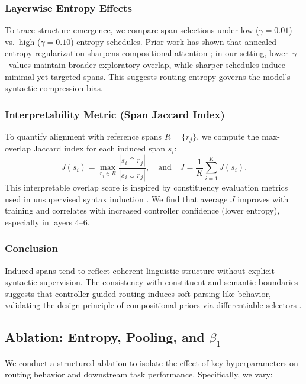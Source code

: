 \subsubsection*{Layerwise Entropy Effects}

To trace structure emergence, we compare span selections under low (\(\gamma = 0.01\)) vs.\ high (\(\gamma = 0.10\)) entropy schedules. Prior work has shown that annealed entropy regularization sharpens compositional attention \cite{pereyra2017regularizing, gupta2022molt}; in our setting, lower~\(\gamma\)~values maintain broader exploratory overlap, while sharper schedules induce minimal yet targeted spans. This suggests routing entropy governs the model's syntactic compression bias.

\subsubsection*{Interpretability Metric (Span Jaccard Index)}

To quantify alignment with reference spans \(R = \{r_j\}\), we compute the max-overlap Jaccard index for each induced span \(s_i\):
\[
J(s_i) = \max_{r_j \in R} \frac{|s_i \cap r_j|}{|s_i \cup r_j|}, \quad \text{and} \quad \bar{J} = \frac{1}{K} \sum_{i=1}^K J(s_i).
\]
This interpretable overlap score is inspired by constituency evaluation metrics used in unsupervised syntax induction \cite{kim2019unsupervised, naradowsky2021structured}. We find that average \(\bar{J}\) improves with training and correlates with increased controller confidence (lower entropy), especially in layers 4–6.

\subsubsection*{Conclusion}

Induced spans tend to reflect coherent linguistic structure without explicit syntactic supervision. The consistency with constituent and semantic boundaries suggests that controller-guided routing induces soft parsing-like behavior, validating the design principle of compositional priors via differentiable selectors \cite{li2021prefix, tay2020sparse}.

\subsection{Ablation: Entropy, Pooling, and \texorpdfstring{$\beta_1$}{β₁}}
\label{sec:ablation}

We conduct a structured ablation to isolate the effect of key hyperparameters on routing behavior and downstream task performance. Specifically, we vary:

